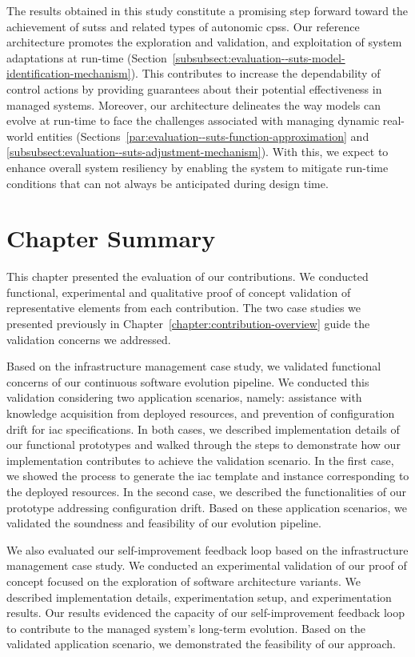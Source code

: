 The results obtained in this study constitute a promising step forward toward the achievement of \glspl{suts} and related types of autonomic \glspl{cps}. Our reference architecture promotes the exploration and validation, and exploitation of system adaptations at run-time (\cf Section~\ref{subsubsect:evaluation--suts-model-identification-mechanism}). This contributes to increase the dependability of control actions by providing guarantees about their potential effectiveness in managed systems. Moreover, our architecture delineates the way models can evolve at run-time to face the challenges associated with managing dynamic real-world entities (\cf Sections~\ref{par:evaluation--suts-function-approximation} and \ref{subsubsect:evaluation--suts-adjustment-mechanism}). With this, we expect to enhance overall system resiliency by enabling the system to mitigate run-time conditions that can not always be anticipated during design time.


\section{Chapter Summary}

This chapter presented the evaluation of our contributions. We conducted functional, experimental and qualitative proof of concept validation of representative elements from each contribution. The two case studies we presented previously in Chapter~\ref{chapter:contribution-overview} guide the validation concerns we addressed.

Based on the infrastructure management case study, we validated functional concerns of our continuous software evolution pipeline. We conducted this validation considering two application scenarios, namely: assistance with knowledge acquisition from deployed resources, and prevention of configuration drift for \gls{iac} specifications. In both cases, we described implementation details of our functional prototypes and walked through the steps to demonstrate how our implementation contributes to achieve the validation scenario. In the first case, we showed the process to generate the \gls{iac} template and instance corresponding to the deployed resources. In the second case, we described the functionalities of our prototype addressing configuration drift. Based on these application scenarios, we validated the soundness and feasibility of our evolution pipeline.

We also evaluated our self-improvement feedback loop based on the infrastructure management case study. We conducted an experimental validation of our proof of concept focused on the exploration of software architecture variants. We described implementation details, experimentation setup, and experimentation results. Our results evidenced the capacity of our self-improvement feedback loop to contribute to the managed system's long-term evolution. Based on the validated application scenario, we demonstrated the feasibility of our approach.

